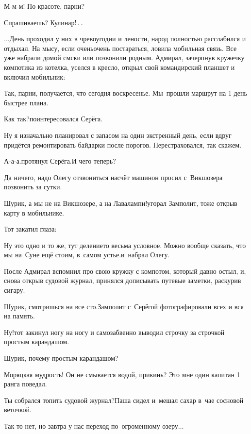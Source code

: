 \diagdash М-м-м! По красоте, парни?

\diagdash Спрашиваешь? Кулинар$\exldots$%

$\ldots$День проходил у них в чревоугодии и лености, народ полностью расслабился и отдыхал. На мысу, если очень\sdash очень  постараться, ловила мобильная связь. Все уже набрали домой смс\sdash ки или позвонили родным. Адмирал, зачерпнув кружечку компотика из котелка, уселся в кресло, открыл свой командирский планшет и включил мобильник:

\diagdash Так, парни, получается, что сегодня воскресенье. Мы~прошли маршрут на 1 день быстрее плана.

\diagdash Как так?\mdash поинтересовался Серёга.

\diagdash Ну я изначально планировал с запасом на один экстренный день, если вдруг придётся ремонтировать байдарки после порогов. Перестраховался, так скажем.

\diagdash А-а-а.\mdash протянул Серёга.\mdash И чего теперь?

\diagdash Да ничего, надо Олегу отзвониться насчёт машин\mdash он просил с~Викшозера позвонить за сутки.

\diagdash Шурик, а мы не на Викшозере, а на Лавалампи!\mdash угорал Замполит, тоже открыв карту в мобильнике.

Тот закатил глаза:

\diagdash Ну это одно и то же, тут деление\sdash то весьма условное. Можно вообще сказать, что мы на~Суне ещё стоим, в~самом устье.\mdash и~набрал Олегу.

После Адмирал вспомнил про свою кружку с компотом, который давно остыл, и, снова открыв судовой журнал, принялся дописывать путевые заметки, раскурив сигару.

\diagdash Шурик, смотришься на все сто.\mdash Замполит с~Серёгой фотографировали всех и вся на память.

\diagdash Ну!\mdash тот закинул ногу на ногу и самозабвенно выводил строчку за строчкой простым карандашом.

\diagdash Шурик, почему простым карандашом?

\diagdash Моряцкая мудрость! Он не смывается водой, прикинь? Это мне один капитан 1 ранга поведал.

\diagdash Ты собрался топить судовой журнал?\mdash Паша сидел и~мешал сахар в~чае сосновой веточкой.

\diagdash Так то нет, но завтра у нас переход по~огроменному озеру$\ldots$

